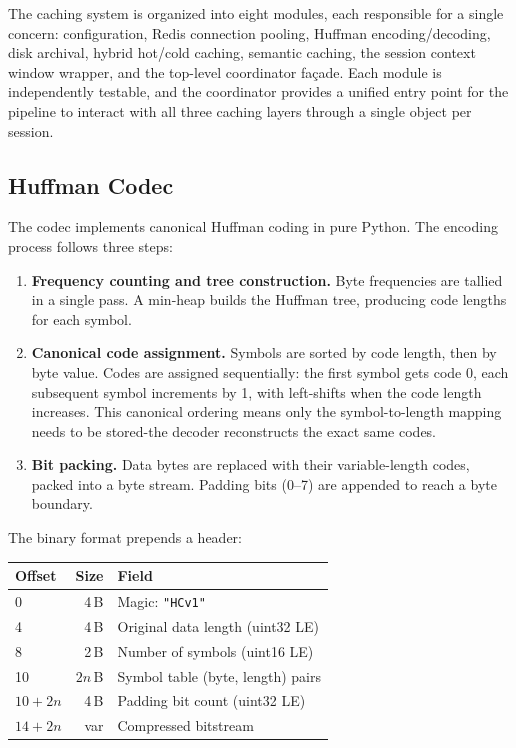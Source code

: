 \documentclass[conference]{IEEEtran}
\begin{document}
The caching system is organized into eight modules, each responsible for a single concern: configuration, Redis connection pooling, Huffman encoding/decoding, disk archival, hybrid hot/cold caching, semantic caching, the session context window wrapper, and the top-level coordinator fa\c{c}ade. Each module is independently testable, and the coordinator provides a unified entry point for the pipeline to interact with all three caching layers through a single object per session.

\subsection{Huffman Codec}

The codec implements canonical Huffman coding in pure Python. The encoding process follows three steps:

\begin{enumerate}
\item \textbf{Frequency counting and tree construction.} Byte frequencies are tallied in a single pass. A min-heap builds the Huffman tree, producing code lengths for each symbol.

\item \textbf{Canonical code assignment.} Symbols are sorted by code length, then by byte value. Codes are assigned sequentially: the first symbol gets code 0, each subsequent symbol increments by 1, with left-shifts when the code length increases. This canonical ordering means only the symbol-to-length mapping needs to be stored-the decoder reconstructs the exact same codes.

\item \textbf{Bit packing.} Data bytes are replaced with their variable-length codes, packed into a byte stream. Padding bits (0--7) are appended to reach a byte boundary.
\end{enumerate}

The binary format prepends a header:

\begin{center}
\begin{tabular}{lrl}
\toprule
\textbf{Offset} & \textbf{Size} & \textbf{Field} \\
\midrule
0 & 4\,B & Magic: \texttt{"HCv1"} \\
4 & 4\,B & Original data length (uint32 LE) \\
8 & 2\,B & Number of symbols (uint16 LE) \\
10 & $2n$\,B & Symbol table (byte, length) pairs \\
$10{+}2n$ & 4\,B & Padding bit count (uint32 LE) \\
$14{+}2n$ & var & Compressed bitstream \\
\bottomrule
\end{tabular}
\end{center}
\end{document}
